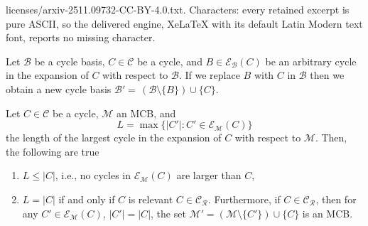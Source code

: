 \documentclass[10pt,a4paper]{amsart}
\newcommand\CycSp{\mathcal{C}}    %
\newcommand\calB{\mathcal{B}}
\newcommand\calM{\mathcal{M}}
\newcommand\expand[2]{\mathcal{E}_{#1}\left(#2\right)}   %
\begin{document}
licenses/arxiv-2511.09732-CC-BY-4.0.txt. Characters: every retained excerpt is pure ASCII, so the delivered engine, XeLaTeX with its default Latin Modern text font, reports no missing character.
\begin{lemma}
	Let $\calB$ be a cycle basis, $C\in\CycSp$ be a cycle, and $B\in\expand{\calB}{C}$ be an arbitrary cycle in the expansion of $C$ with respect to $\calB$. If we replace $B$ with $C$ in $\calB$ then we obtain a new cycle basis $\calB' {=}\, (\calB{\setminus} \{B\}){\cup}\{C\}$.\nolinebreak %
	\label{Lem:Bas_Ex}
\end{lemma}

\begin{lemma}
	Let $C\in\CycSp$ be a cycle, $\calM$ an MCB, and
	$$L = \max\{|C'|:C'\in\expand{\calM}{C}\}$$
	the length of the largest cycle in the expansion of $C$ with respect to $\calM$.
	Then, the following are true
	\begin{enumerate}
		\item $L\le |C|$, i.e., no cycles in $\expand{\calM}{C}$ are larger than $C$,
		\item $L=|C|$ if and only if $C$ is relevant $C\in\mathcal{C_R}$. Furthermore, if $C\in\mathcal{C_R}$, then for any $C'\in\expand{\calM}{C}$, $|C'|=|C|$, the set $\calM'=(\calM\setminus\{C'\})\cup\{C\}$ is an MCB.
	\end{enumerate}
	\label{Lem:Relevant_MCB_Test}
\end{lemma}
\end{document}
